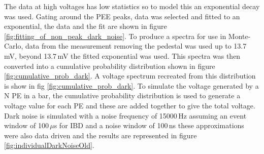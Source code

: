The data at high voltages has low statistics so to model this an exponential decay was used. Gating around the PEE peaks, data was selected and fitted to an exponential, the data and the fit are shown in figure \ref{fig:fitting_of_non_peak_dark_noise}. To produce a spectra for use in Monte-Carlo, data from the measurement removing the pedestal was used up to 13.7\,mV, beyond 13.7\,mV the fitted exponential was used. This spectra was then converted into a cumulative probability distribution shown in figure \ref{fig:cumulative_prob_dark}. A voltage spectrum recreated from this distribution is show in fig \ref{fig:cumulative_prob_dark}. To simulate the voltage generated by a N PE in a bar, the cumulative probability distribution is used to generate a voltage value for each PE and these are added together to give the total voltage. Dark noise is simulated with a noise frequency of 15000\,Hz assuming an event window of 100\,$\mu$s for IBD and a noise window of 100\,ns these approximations were also data driven and the results are represented in figure \ref{fig:individualDarkNoiseOld}.
